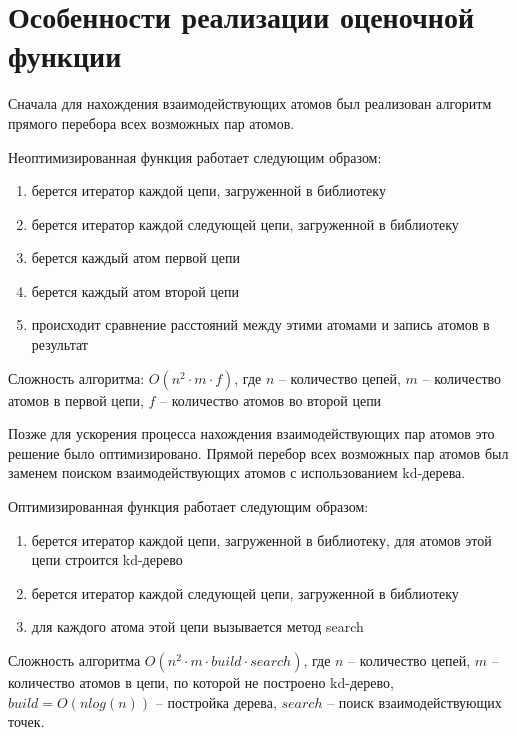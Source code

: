 \section{Особенности реализации оценочной функции}


Сначала для нахождения взаимодействующих атомов был реализован алгоритм прямого перебора всех возможных пар атомов.

Неоптимизированная функция работает следующим образом:

\begin{enumerate}
	\item берется итератор каждой цепи, загруженной в библиотеку
	\item берется итератор каждой следующей цепи, загруженной в библиотеку
	\item берется каждый атом первой цепи
	\item берется каждый атом второй цепи
	\item происходит сравнение расстояний между этими атомами и запись атомов в результат
\end{enumerate} 

Сложность алгоритма: $O(n^2 \cdot m \cdot f)$, где $n$ -- количество цепей, $m$ -- количество атомов в первой цепи, $f$ -- количество атомов во второй цепи

Позже для ускорения процесса нахождения взаимодействующих пар атомов это решение было оптимизировано. Прямой перебор всех возможных пар атомов был заменем поиском взаимодействующих атомов с использованием kd-дерева.

Оптимизированная функция работает следующим образом:

\begin{enumerate}
	\item берется итератор каждой цепи, загруженной в библиотеку, для атомов этой цепи строится kd-дерево
	\item берется итератор каждой следующей цепи, загруженной в библиотеку
	\item для каждого атома этой цепи вызывается метод search
\end{enumerate} 

Сложность алгоритма $O(n^2 \cdot m \cdot build \cdot search)$, где $n$ -- количество цепей, $m$ -- количество атомов в цепи, по которой не построено kd-дерево, $build = O(n log(n))$ -- постройка дерева, $search$ -- поиск взаимодействующих точек.


